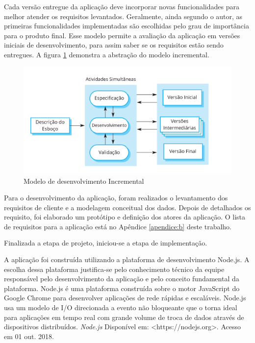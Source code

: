 \par
Cada versão entregue da aplicação deve incorporar novas funcionalidades para melhor atender os requisitos levantados. Geralmente, ainda segundo o autor, as primeiras funcionalidades
implementadas são escolhidas pelo grau de importância para o produto final. Esse modelo permite a avaliação da aplicação em versões iniciais de desenvolvimento, para assim saber 
se os requisitos estão sendo entregues. A figura \ref{fig:modelo-incremental} demonstra a abstração do modelo incremental.


\begin{figure}[!ht]
    \centering
    \includegraphics[scale=0.20]{./figuras/modelo_incremental.png}
    \caption{Modelo de desenvolvimento Incremental }
    \label{fig:modelo-incremental}
\end{figure}

\par
Para o desenvolvimento da aplicação, foram realizados o levantamento dos requisitos de cliente e a modelagem conceitual dos dados.
Depois de detalhados os requisito, foi elaborado um protótipo e definição dos atores da aplicação. O lista de requisitos para a aplicação está no Apêndice \ref{apendice:b} deste trabalho. 

\par
Finalizada a etapa de projeto, iniciou-se a etapa de implementação. 

A aplicação foi construída utilizando a plataforma de desenvolvimento Node.js. A escolha dessa plataforma justifica-se pelo conhecimento técnico da equipe
responsável pelo desenvolvimento da aplicação e pelo conceito fundamental da plataforma. Node.js é uma plataforma construída sobre o motor JavaScript do 
Google Chrome para desenvolver aplicações de rede rápidas e escaláveis. Node.js usa um modelo de I/O direcionada a evento não bloqueante que o torna
ideal para aplicações em tempo real com grande volume de troca de dados através de dispositivos distribuídos. 
\textit{Node.js} Disponível em: <https://nodejs.org>. Acesso em 01 out. 2018.

